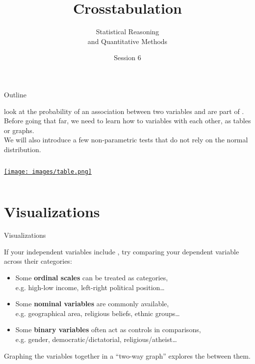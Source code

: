 \documentclass{beamer}
\author{Statistical Reasoning\\and Quantitative Methods}
\title{Crosstabulation}
\institute{François Briatte \& Ivaylo Petev}
\date{Session 6}
\begin{document}
		
	\begin{frame}[t,plain]
		\titlepage
	\end{frame}
	
	\begin{frame}[t]{Outline}
	
	 look at the probability of an association between two variables and are part of .\\[.5em]
	
	Before going that far, we need to learn how to  variables with each other, as tables or graphs.\\[.5em]
	
	We will also introduce a few non-parametric tests that do not rely on the normal distribution.\\[.5em]
	
		\begin{columns}[T]
			\tableofcontents[hideallsubsections]
			\begin{center}
				\href{http://ideas.repec.org/c/boc/bocode/s447101.html}{\texttt{[image: images/table.png]}}
			\end{center}		
		\end{columns}
		\vspace{2em}
	\end{frame}
		
	\section{Visualizations}

	\begin{frame}[t]{Visualizations}
	
	If your independent variables include , try comparing your dependent variable across their categories:
	
	\begin{itemize}
		\item Some \textbf{ordinal scales} can be treated as categories,\\e.g. high-low income, left-right political position…
		\item Some \textbf{nominal variables} are commonly available,\\e.g.  geographical area, religious beliefs, ethnic groups…
		\item Some \textbf{binary variables} often act as controls in comparisons,\\e.g. gender, democratic/dictatorial, religious/atheist…
	\end{itemize}
	
	Graphing the variables together in a ``two-way graph'' explores the  between them.
	\end{frame}
	
\end{document}
